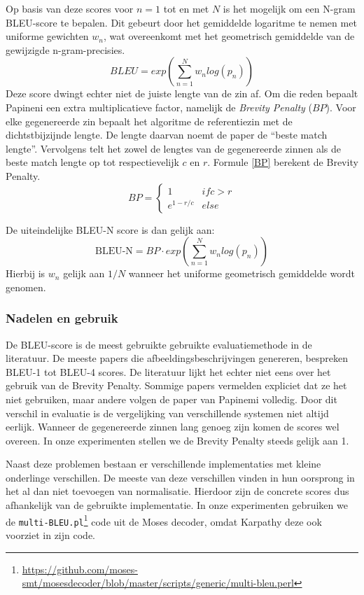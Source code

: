 Op basis van deze scores voor $n=1$ tot en met $N$ is het mogelijk om een N-gram BLEU-score te bepalen. Dit gebeurt door het gemiddelde logaritme te nemen met uniforme gewichten $w_n$, wat overeenkomt met het geometrisch gemiddelde van de gewijzigde n-gram-precisies.
\begin{equation}
BLEU = exp(\sum\limits_{n=1}^N w_nlog(p_n))
\end{equation}
Deze score dwingt echter niet de juiste lengte van de zin af. Om die reden bepaalt Papineni een extra multiplicatieve factor, namelijk de \emph{Brevity Penalty} ($BP$). Voor elke gegenereerde zin bepaalt het algoritme de referentiezin met de dichtstbijzijnde lengte. De lengte daarvan noemt de paper de ``beste match lengte''. Vervolgens telt het zowel de lengtes van de gegenereerde zinnen als de beste match lengte op tot respectievelijk $c$ en $r$. Formule \eqref{BP} berekent de Brevity Penalty.
\begin{equation}BP=
 \begin{cases}
1 & if c > r \\
e^{1-r/c} & else
\end{cases}
\label{BP}
\end{equation}

De uiteindelijke BLEU-N score is dan gelijk aan:
\begin{equation}
\text{BLEU-N} = BP\cdot exp(\sum\limits_{n=1}^N w_nlog(p_n))
\end{equation}
Hierbij is $w_n$ gelijk aan $1/N$ wanneer het uniforme geometrisch gemiddelde wordt genomen.

\subsubsection{Nadelen en gebruik}
De BLEU-score is de meest gebruikte gebruikte evaluatiemethode in de literatuur. De meeste papers die afbeeldingsbeschrijvingen genereren, bespreken BLEU-1 tot BLEU-4 scores. De literatuur lijkt het echter niet eens over het gebruik van de Brevity Penalty. Sommige papers vermelden expliciet dat ze het niet gebruiken, maar andere volgen de paper van Papinemi volledig. Door dit verschil in evaluatie is de vergelijking van verschillende systemen niet altijd eerlijk. Wanneer de gegenereerde zinnen lang genoeg zijn komen de scores wel overeen.
In onze experimenten stellen we de Brevity Penalty steeds gelijk aan 1.

Naast deze problemen bestaan er verschillende implementaties met kleine onderlinge verschillen. De meeste van deze verschillen vinden in hun oorsprong in het al dan niet toevoegen van normalisatie. Hierdoor zijn de concrete scores dus afhankelijk van de gebruikte implementatie. In onze experimenten gebruiken we de \texttt{multi-BLEU.pl}\footnote{\url{https://github.com/moses-smt/mosesdecoder/blob/master/scripts/generic/multi-bleu.perl}} code uit de Moses decoder\cite{Koehn2006}, omdat Karpathy deze ook voorziet in zijn code.

